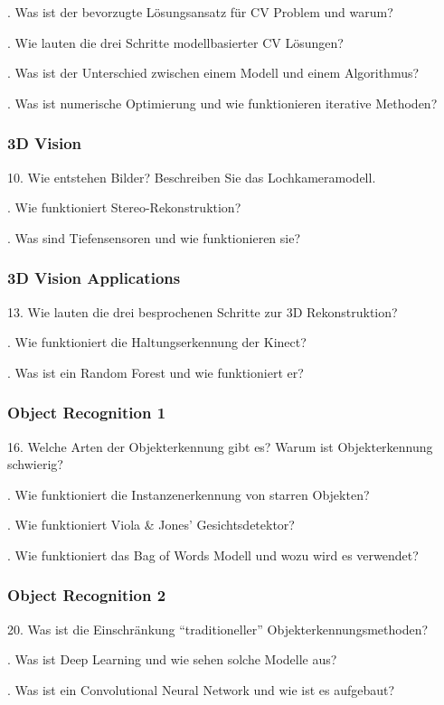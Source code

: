 \documentclass[paper=A4,11pt]{scrartcl}
\begin{document}
\bigskip{}. Was ist der bevorzugte Lösungsansatz für CV Problem und warum?

\bigskip{}. Wie lauten die drei Schritte modellbasierter CV Lösungen?

\bigskip{}. Was ist der Unterschied zwischen einem Modell und einem Algorithmus?

\bigskip{}. Was ist numerische Optimierung und wie funktionieren iterative Methoden?


\subsubsection*{3D Vision} %

10. Wie entstehen Bilder? Beschreiben Sie das Lochkameramodell.

\bigskip{}. Wie funktioniert Stereo-Rekonstruktion?

\bigskip{}. Was sind Tiefensensoren und wie funktionieren sie?


\subsubsection*{3D Vision Applications} %

13. Wie lauten die drei besprochenen Schritte zur 3D Rekonstruktion?

\bigskip{}. Wie funktioniert die Haltungserkennung der Kinect?

\bigskip{}. Was ist ein Random Forest und wie funktioniert er?


\subsubsection*{Object Recognition 1} %

16. Welche Arten der Objekterkennung gibt es? Warum ist Objekterkennung schwierig?

\bigskip{}. Wie funktioniert die Instanzenerkennung von starren Objekten?

\bigskip{}. Wie funktioniert Viola \& Jones' Gesichtsdetektor?

\bigskip{}. Wie funktioniert das Bag of Words Modell und wozu wird es verwendet?


\subsubsection*{Object Recognition 2} %

20. Was ist die Einschränkung \enquote{traditioneller} Objekterkennungsmethoden?

\bigskip{}. Was ist Deep Learning und wie sehen solche Modelle aus?

\bigskip{}. Was ist ein Convolutional Neural Network und wie ist es aufgebaut?


\printbibliography
\end{document}
